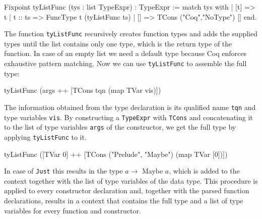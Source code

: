 \documentclass[paper = a4, fleqn, abstract=on, twoside]{scrreprt}
\newcommand{\coqinline}[1]{\texttt{#1}}
\begin{document}
\begin{coqcode}
Fixpoint tyListFunc (tys : list TypeExpr) : TypeExpr :=
  match tys with
  | [t]     => t
  | t :: ts => FuncType t (tyListFunc ts)
  | []      => TCons ("Coq","NoType") []
  end.
\end{coqcode}
The function \coqinline{tyListFunc} recursively creates function types and adds the supplied types until the list contains only one type, which is the return type of the function. In case of an empty list we need a default type because Coq enforces exhaustive pattern matching. Now we can use \coqinline{tyListFunc} to assemble the full type:
\begin{coqcode}
tyListFunc (args ++ [TCons tqn (map TVar vis)])
\end{coqcode}
The information obtained from the type declaration is its qualified name \texttt{tqn} and type variables \texttt{vis}. By constructing a \coqinline{TypeExpr} with \coqinline{TCons} and concatenating it to the list of type variables \texttt{args} of the constructor, we get the full type by applying \coqinline{tyListFunc} to it.
\begin{coqcode}
tyListFunc ([TVar 0] ++ [TCons ("Prelude", "Maybe") (map TVar [0])])
\end{coqcode} 
In case of \texttt{Just} this results in the type $a \rightarrow$ Maybe $a$, which is added to the context together with the list of type variables of the data type. This procedure is applied to every constructor declaration and, together with the parsed function declarations, results in a context that contains the full type and a list of type variables for every function and constructor.
\end{document}
